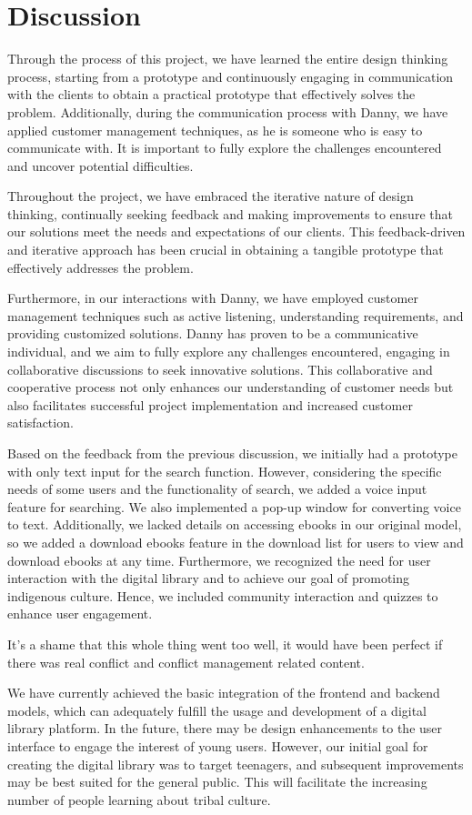 \chapter{Discussion}

Through the process of this project, we have learned the entire design thinking process, starting from a prototype and continuously engaging in communication with the clients to obtain a practical prototype that effectively solves the problem. Additionally, during the communication process with Danny, we have applied customer management techniques, as he is someone who is easy to communicate with. It is important to fully explore the challenges encountered and uncover potential difficulties.

Throughout the project, we have embraced the iterative nature of design thinking, continually seeking feedback and making improvements to ensure that our solutions meet the needs and expectations of our clients. This feedback-driven and iterative approach has been crucial in obtaining a tangible prototype that effectively addresses the problem.

Furthermore, in our interactions with Danny, we have employed customer management techniques such as active listening, understanding requirements, and providing customized solutions. Danny has proven to be a communicative individual, and we aim to fully explore any challenges encountered, engaging in collaborative discussions to seek innovative solutions. This collaborative and cooperative process not only enhances our understanding of customer needs but also facilitates successful project implementation and increased customer satisfaction.

Based on the feedback from the previous discussion, we initially had a prototype with only text input for the search function. However, considering the specific needs of some users and the functionality of search, we added a voice input feature for searching. We also implemented a pop-up window for converting voice to text. Additionally, we lacked details on accessing ebooks in our original model, so we added a download ebooks feature in the download list for users to view and download ebooks at any time. Furthermore, we recognized the need for user interaction with the digital library and to achieve our goal of promoting indigenous culture. Hence, we included community interaction and quizzes to enhance user engagement.

It's a shame that this whole thing went too well, it would have been perfect if there was real conflict and conflict management related content.

We have currently achieved the basic integration of the frontend and backend models, which can adequately fulfill the usage and development of a digital library platform. In the future, there may be design enhancements to the user interface to engage the interest of young users. However, our initial goal for creating the digital library was to target teenagers, and subsequent improvements may be best suited for the general public. This will facilitate the increasing number of people learning about tribal culture.


